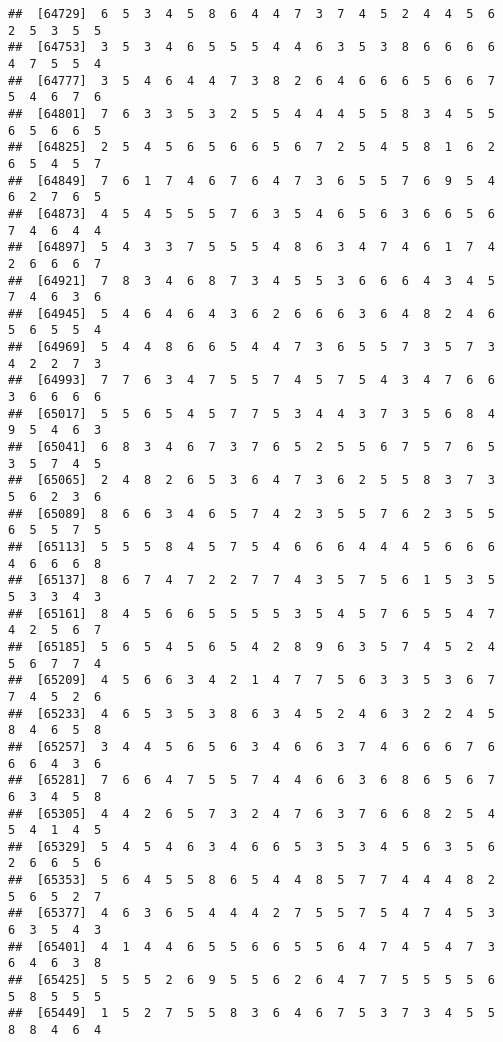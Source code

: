 \documentclass[
]{book}
\begin{document}
\begin{verbatim}
##  [64729]  6  5  3  4  5  8  6  4  4  7  3  7  4  5  2  4  4  5  6  2  5  3  5  5
##  [64753]  3  5  3  4  6  5  5  5  4  4  6  3  5  3  8  6  6  6  6  4  7  5  5  4
##  [64777]  3  5  4  6  4  4  7  3  8  2  6  4  6  6  6  5  6  6  7  5  4  6  7  6
##  [64801]  7  6  3  3  5  3  2  5  5  4  4  4  5  5  8  3  4  5  5  6  5  6  6  5
##  [64825]  2  5  4  5  6  5  6  6  5  6  7  2  5  4  5  8  1  6  2  6  5  4  5  7
##  [64849]  7  6  1  7  4  6  7  6  4  7  3  6  5  5  7  6  9  5  4  6  2  7  6  5
##  [64873]  4  5  4  5  5  5  7  6  3  5  4  6  5  6  3  6  6  5  6  7  4  6  4  4
##  [64897]  5  4  3  3  7  5  5  5  4  8  6  3  4  7  4  6  1  7  4  2  6  6  6  7
##  [64921]  7  8  3  4  6  8  7  3  4  5  5  3  6  6  6  4  3  4  5  7  4  6  3  6
##  [64945]  5  4  6  4  6  4  3  6  2  6  6  6  3  6  4  8  2  4  6  5  6  5  5  4
##  [64969]  5  4  4  8  6  6  5  4  4  7  3  6  5  5  7  3  5  7  3  4  2  2  7  3
##  [64993]  7  7  6  3  4  7  5  5  7  4  5  7  5  4  3  4  7  6  6  3  6  6  6  6
##  [65017]  5  5  6  5  4  5  7  7  5  3  4  4  3  7  3  5  6  8  4  9  5  4  6  3
##  [65041]  6  8  3  4  6  7  3  7  6  5  2  5  5  6  7  5  7  6  5  3  5  7  4  5
##  [65065]  2  4  8  2  6  5  3  6  4  7  3  6  2  5  5  8  3  7  3  5  6  2  3  6
##  [65089]  8  6  6  3  4  6  5  7  4  2  3  5  5  7  6  2  3  5  5  6  5  5  7  5
##  [65113]  5  5  5  8  4  5  7  5  4  6  6  6  4  4  4  5  6  6  6  4  6  6  6  8
##  [65137]  8  6  7  4  7  2  2  7  7  4  3  5  7  5  6  1  5  3  5  5  3  3  4  3
##  [65161]  8  4  5  6  6  5  5  5  5  3  5  4  5  7  6  5  5  4  7  4  2  5  6  7
##  [65185]  5  6  5  4  5  6  5  4  2  8  9  6  3  5  7  4  5  2  4  5  6  7  7  4
##  [65209]  4  5  6  6  3  4  2  1  4  7  7  5  6  3  3  5  3  6  7  7  4  5  2  6
##  [65233]  4  6  5  3  5  3  8  6  3  4  5  2  4  6  3  2  2  4  5  8  4  6  5  8
##  [65257]  3  4  4  5  6  5  6  3  4  6  6  3  7  4  6  6  6  7  6  6  6  4  3  6
##  [65281]  7  6  6  4  7  5  5  7  4  4  6  6  3  6  8  6  5  6  7  6  3  4  5  8
##  [65305]  4  4  2  6  5  7  3  2  4  7  6  3  7  6  6  8  2  5  4  5  4  1  4  5
##  [65329]  5  4  5  4  6  3  4  6  6  5  3  5  3  4  5  6  3  5  6  2  6  6  5  6
##  [65353]  5  6  4  5  5  8  6  5  4  4  8  5  7  7  4  4  4  8  2  5  6  5  2  7
##  [65377]  4  6  3  6  5  4  4  4  2  7  5  5  7  5  4  7  4  5  3  6  3  5  4  3
##  [65401]  4  1  4  4  6  5  5  6  6  5  5  6  4  7  4  5  4  7  3  6  4  6  3  8
##  [65425]  5  5  5  2  6  9  5  5  6  2  6  4  7  7  5  5  5  5  6  5  8  5  5  5
##  [65449]  1  5  2  7  5  5  8  3  6  4  6  7  5  3  7  3  4  5  5  8  8  4  6  4

\end{verbatim}
\end{document}
